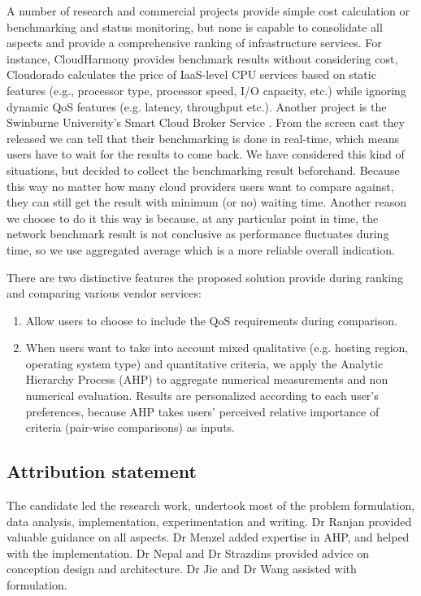 A number of research and commercial projects provide simple cost calculation or benchmarking and status monitoring, but none is capable to consolidate all aspects and provide a comprehensive ranking of infrastructure services. For instance, CloudHarmony \cite{cloudharmony_speedtest} provides benchmark results without considering cost, Cloudorado \cite{Cloudorado} calculates the price of IaaS-level CPU services based on static features (e.g., processor type, processor speed, I/O capacity, etc.) while ignoring dynamic QoS features (e.g. latency, throughput etc.). Another project is the Swinburne University's Smart Cloud Broker Service \cite{SwinburneCloudBroker}. From the screen cast they released we can tell that their benchmarking is done in real-time, which means users have to wait for the results to come back. We have considered this kind of situations, but decided to collect the benchmarking result beforehand. Because this way no matter how many cloud providers users want to compare against, they can still get the result with minimum (or no) waiting time. Another reason we choose to do it this way is because, at any particular point in time, the network benchmark result is not conclusive as performance fluctuates during time, so we use aggregated average which is a more reliable overall indication.

There are two distinctive features the proposed solution provide during ranking and comparing various vendor services: 
\begin{enumerate}
	\item
	Allow users to choose to include the QoS requirements during comparison.
	\item
    When users want to take into account mixed qualitative (e.g. hosting region, operating system type) and quantitative criteria, we apply the Analytic Hierarchy Process (AHP) to aggregate numerical measurements and non numerical evaluation. Results are personalized according to each user's preferences, because AHP takes users' perceived relative importance of criteria (pair-wise comparisons) as inputs.
\end{enumerate}

\subsection{Attribution statement}
The candidate led the research work, undertook most of the problem formulation, data analysis, implementation, experimentation and writing.
Dr Ranjan provided valuable guidance on all aspects. 
Dr Menzel added expertise in AHP, and helped with the implementation.
Dr Nepal and Dr Strazdins provided advice on conception design and architecture.
Dr Jie and Dr Wang assisted with formulation.

